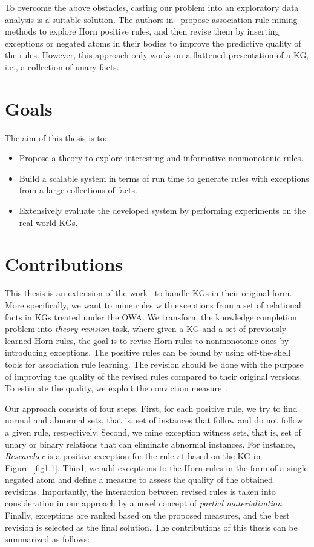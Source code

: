 To overcome the above obstacles, casting our problem into an exploratory data analysis is a suitable solution. The authors in~\cite{ref12} propose association rule mining methods to explore Horn positive rules, and then revise them by inserting exceptions or negated atoms in their bodies to improve the predictive quality of the rules. However, this approach only works on a flattened presentation of a KG, i.e., a collection of unary facts.

\section{Goals}

The aim of this thesis is to:
\begin{itemize}
\item Propose a theory to explore interesting and informative nonmonotonic rules.
\item Build a scalable system in terms of run time to generate rules with exceptions from a large collections of facts.
\item Extensively evaluate the developed system by performing experiments on the real world KGs.
\end{itemize}

\section{Contributions}

This thesis is an extension of the work~\cite{ref12} to handle KGs in their original form. More specifically, we want to mine rules with exceptions from a set of relational facts in KGs treated under the OWA. We transform the knowledge completion problem into \textit{theory revision} task, where given a KG and a set of previously learned Horn rules, the goal is to revise Horn rules to nonmonotonic ones by introducing exceptions. The positive rules can be found by using off-the-shell tools for association rule learning. The revision should be done with the purpose of improving the quality of the revised rules compared to their original versions. To estimate the quality, we exploit the conviction measure~\cite{ref48}.

Our approach consists of four steps. First, for each positive rule, we try to find normal and abnormal sets, that is, set of instances that follow and do not follow a given rule, respectively. Second, we mine exception witness sets, that is, set of unary or binary relations that can eliminate abnormal instances. For instance, \textit{Researcher} is a positive exception for the rule $r1$ based on the KG in Figure~\ref{fig1.1}. Third, we add exceptions to the Horn rules in the form of a single negated atom and define a measure to assess the quality of the obtained revisions. Importantly, the interaction between revised rules is taken into consideration in our approach by a novel concept of \textit{partial materialization}. Finally, exceptions are ranked based on the proposed measures, and the best revision is selected as the final solution. The contributions of this thesis can be summarized as follows:

